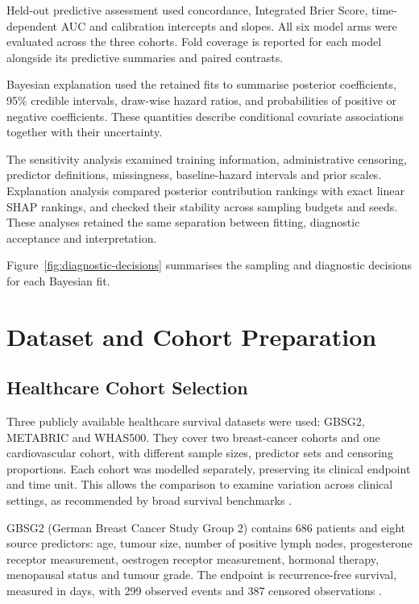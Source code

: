 Held-out predictive assessment used concordance, Integrated Brier Score, time-dependent AUC and calibration intercepts and slopes. All six model arms were evaluated across the three cohorts. Fold coverage is reported for each model alongside its predictive summaries and paired contrasts.

Bayesian explanation used the retained fits to summarise posterior coefficients, 95\% credible intervals, draw-wise hazard ratios, and probabilities of positive or negative coefficients. These quantities describe conditional covariate associations together with their uncertainty.

The sensitivity analysis examined training information, administrative censoring, predictor definitions, missingness, baseline-hazard intervals and prior scales. Explanation analysis compared posterior contribution rankings with exact linear SHAP rankings, and checked their stability across sampling budgets and seeds. These analyses retained the same separation between fitting, diagnostic acceptance and interpretation.

Figure~\ref{fig:diagnostic-decisions} summarises the sampling and diagnostic decisions for each Bayesian fit.



\section{Dataset and Cohort Preparation}\label{data-set-and-cohort-preparation.}

\subsection{Healthcare Cohort Selection}\label{healthcare-cohort-selection}

Three publicly available healthcare survival datasets were used: GBSG2, METABRIC and WHAS500. They cover two breast-cancer cohorts and one cardiovascular cohort, with different sample sizes, predictor sets and censoring proportions. Each cohort was modelled separately, preserving its clinical endpoint and time unit. This allows the comparison to examine variation across clinical settings, as recommended by broad survival benchmarks \cite{ref33,ref44}.

GBSG2 (German Breast Cancer Study Group 2) contains 686 patients and eight source predictors: age, tumour size, number of positive lymph nodes, progesterone receptor measurement, oestrogen receptor measurement, hormonal therapy, menopausal status and tumour grade. The endpoint is recurrence-free survival, measured in days, with 299 observed events and 387 censored observations \cite{schumacher1994,polsterl2020}.

